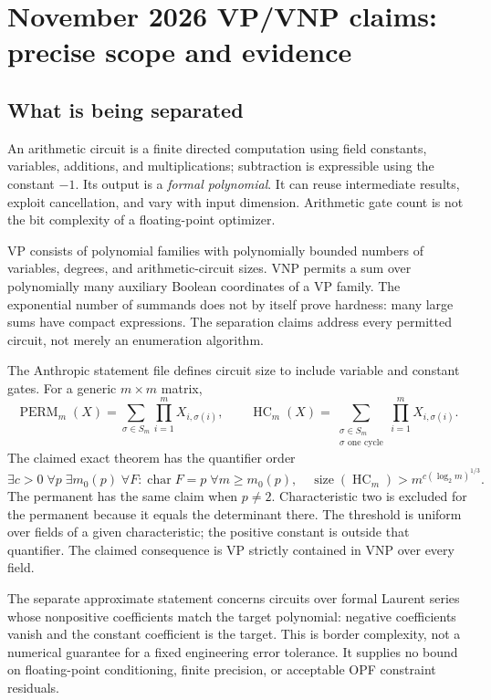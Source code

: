 \documentclass[11pt,letterpaper]{article}
\begin{document}
\section{November 2026 VP/VNP claims: precise scope and evidence}
\label{sec:vp}
\subsection{What is being separated}
An arithmetic circuit is a finite directed computation using field constants, variables, additions, and multiplications; subtraction is expressible using the constant $-1$. Its output is a \emph{formal polynomial}. It can reuse intermediate results, exploit cancellation, and vary with input dimension. Arithmetic gate count is not the bit complexity of a floating-point optimizer.

VP consists of polynomial families with polynomially bounded numbers of variables, degrees, and arithmetic-circuit sizes. VNP permits a sum over polynomially many auxiliary Boolean coordinates of a VP family. The exponential number of summands does not by itself prove hardness: many large sums have compact expressions. The separation claims address every permitted circuit, not merely an enumeration algorithm.

The Anthropic statement file defines circuit size to include variable and constant gates. For a generic $m\times m$ matrix,
\[
 \operatorname{PERM}_m(X)=\sum_{\sigma\in S_m}\prod_{i=1}^m X_{i,\sigma(i)},\qquad
 \operatorname{HC}_m(X)=\sum_{\substack{\sigma\in S_m\\\sigma\text{ one cycle}}}\prod_{i=1}^m X_{i,\sigma(i)}.
\]
The claimed exact theorem has the quantifier order
\begin{equation}
 \exists c>0\;\forall p\;\exists m_0(p)\;\forall F:\operatorname{char}F=p\;
 \forall m\ge m_0(p),\quad
 \operatorname{size}(\operatorname{HC}_m)>m^{c(\log_2m)^{1/3}} .
 \label{eq:vp}
\end{equation}
The permanent has the same claim when $p\ne2$. Characteristic two is excluded for the permanent because it equals the determinant there. The threshold is uniform over fields of a given characteristic; the positive constant is outside that quantifier. The claimed consequence is VP strictly contained in VNP over every field.\cite{anthropicstatement}

The separate approximate statement concerns circuits over formal Laurent series whose nonpositive coefficients match the target polynomial: negative coefficients vanish and the constant coefficient is the target. This is border complexity, not a numerical guarantee for a fixed engineering error tolerance. It supplies no bound on floating-point conditioning, finite precision, or acceptable OPF constraint residuals.\cite{anthropicstatement}
\end{document}
